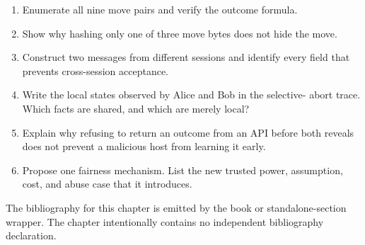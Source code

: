 \begin{enumerate}
    \item Enumerate all nine move pairs and verify the outcome formula.
    \item Show why hashing only one of three move bytes does not hide the move.
    \item Construct two messages from different sessions and identify every
    field that prevents cross-session acceptance.
    \item Write the local states observed by Alice and Bob in the selective-
    abort trace. Which facts are shared, and which are merely local?
    \item Explain why refusing to return an outcome from an API before both
    reveals does not prevent a malicious host from learning it early.
    \item Propose one fairness mechanism. List the new trusted power,
    assumption, cost, and abuse case that it introduces.
\end{enumerate}

The bibliography for this chapter is emitted by the book or standalone-section
wrapper. The chapter intentionally contains no independent bibliography
declaration.

